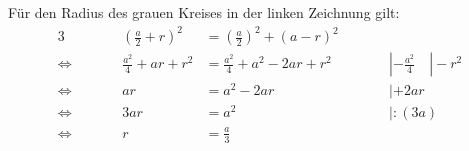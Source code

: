 \begin{exercise}
\begin{center}
    \end{center}
  \fi
  \ifoutcome\outcome\par
    \newcommand{\fakewidth}[1]
    {%
      \makebox[0pt][l]
      {%
        \ensuremath
        {%
          \displaystyle#1%
        }%
      }%
    }%

    Für den Radius des grauen Kreises in der linken Zeichnung gilt:
    \begin{alignat*}{3}
                     &\qquad & \left(\frac{a}{2}+r\right)^2&=\left(\frac{a}{2}\right)^2+(a-r)^2 & \qquad&                          \\[2ex]
      \Leftrightarrow&\qquad &         \frac{a^2}{4}+ar+r^2&=\frac{a^2}{4}+a^2-2ar+r^2          & \qquad&|-\frac{a^2}{4}\quad|-r^2 \\[2ex]
      \Leftrightarrow&\qquad &                       ar    &=              a^2-2ar              & \qquad&|+2ar                     \\[2ex]
      \Leftrightarrow&\qquad &                      3ar    &=              a^2                  & \qquad&|:(3a)                    \\[2ex]
      \Leftrightarrow&\qquad &                        r    &=        \frac{a}{3}                & \qquad&
    \end{alignat*}


\end{exercise}
